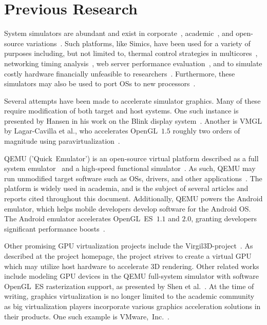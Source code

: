 
\section{Previous Research}
\label{sec:previousresearch}
System simulators are abundant and exist in corporate~, academic~, and open-source variations~.
Such platforms, like Simics, have been used for a variety of purposes including, but not limited to, thermal control strategies in multicores~, networking timing analysis~, web server performance evaluation~, and to simulate costly hardware financially unfeasible to researchers~.
Furthermore, these simulators may also be used to port OSs to new processors~.

Several attempts have been made to accelerate simulator graphics. Many of these require modification of both target and host systems.
One such instance is presented by Hansen in his work on the Blink display system~.
Another is VMGL by Lagar-Cavilla et al., who accelerates OpenGL~$1.5$ roughly two orders of magnitude using paravirtualization~.

QEMU ('Quick~Emulator') is an open-source virtual platform described as a full system emulator~ and a high-speed functional simulator~.
As such, QEMU may run unmodified target software such as OSs, drivers, and other applications~.
The platform is widely used in academia, and is the subject of several articles and reports cited throughout this document.
Additionally, QEMU powers the Android emulator, which helps mobile developers develop software for the Android OS.
The Android emulator accelerates OpenGL~ES~$1.1$ and $2.0$, granting developers significant performance boosts~.

Other promising GPU virtualization projects include the Virgil3D-project~.
As described at the project homepage, the project strives to create a virtual GPU which may utilize host hardware to accelerate 3D rendering.
Other related works include modeling GPU devices in the QEMU full-system simulator with software OpenGL~ES rasterization support, as presented by Shen et al.~.
At the time of writing, graphics virtualization is no longer limited to the academic community as big virtualization players incorporate various graphics acceleration solutions in their products.
One such example is VMware,~Inc.~.

